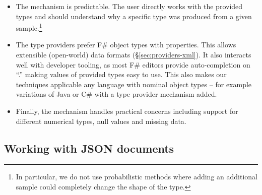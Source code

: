 \documentclass[10pt,preprint,blind,clearpagebib]{sigplanconf}
\newcommand{\kvd}[1]{\textnormal{\textcolor{kvdclr}{\sffamily #1}}}
\begin{document}
\begin{itemize}
\item The mechanism is predictable. The user directly works with the provided types and should 
  understand why a specific type was produced from a given sample.\footnote{In particular, we do 
  not use probabilistic methods where adding an additional sample could completely change the 
  shape of the type.}

\item The type providers prefer F\# object types with properties. This allows extensible 
  (open-world) data formats (\S\ref{sec:providers-xml}). It also interacts well with developer tooling,
  as most F\# editors provide auto-completion on ``.'' making values of provided types easy to use.
  This also makes our techniques applicable any language with nominal object types -- for example
  variations of Java or C# with a type provider mechanism added.

\item Finally, the mechanism handles practical concerns including
  support for different numerical types, \kvd{null} values and missing data.
\end{itemize}


\subsection{Working with JSON documents}
\label{sec:providers-json}
\end{document}
